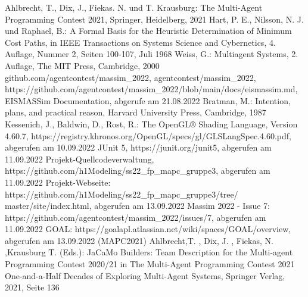 \documentclass[runningheads]{llncs}
\begin{document}
%
%
%
% 
% 
%
\begin{thebibliography}{8}
	Ahlbrecht, T., Dix, J., Fiekas. N. und T. Krausburg: The Multi-Agent Programming Contest 2021, Springer, Heidelberg, 2021
	Hart, P. E., Nilsson, N. J. und Raphael, B.: A Formal Basis for the Heuristic Determination of Minimum Cost Paths, in IEEE Transactions on Systems Science and Cybernetics, 4. Auflage, Nummer 2, Seiten 100-107, Juli 1968
	Weiss, G.: Multiagent Systems, 2. Auflage, The MIT Press, Cambridge, 2000
	github.com/agentcontest/massim\_2022, agentcontest/massim\_2022, \\ https://github.com/agentcontest/massim\_2022/blob/main/docs/eismassim.md, EISMASSim Documentation, abgerufe am 21.08.2022
	Bratman, M.: Intention, plans, and practical reason, Harvard University Press, Cambridge, 1987
	Kessenich, J., Baldwin, D., Rost, R.: The OpenGL® Shading Language, Version 4.60.7, https://registry.khronos.org/OpenGL/specs/gl/GLSLangSpec.4.60.pdf, abgerufen am 10.09.2022
	JUnit 5, https://junit.org/junit5, abgerufen am 11.09.2022
	Projekt-Quellcodeverwaltung, https://github.com/h1Modeling/ss22\_fp\_mapc\_gruppe3, abgerufen am 11.09.2022
	Projekt-Webseite: https://github.com/h1Modeling/ss22\_fp\_mapc\_gruppe3/tree/ master/site/index.html, abgerufen am 13.09.2022
	Massim 2022 - Issue 7: https://github.com/agentcontest/massim\_2022/issues/7, abgerufen am 11.09.2022
	GOAL: https://goalapl.atlassian.net/wiki/spaces/GOAL/overview, abgerufen am 13.09.2022
	\bibitem(MAPC2021)
	Ahlbrecht,T. , Dix, J. , Fiekas, N. ,Krausburg T. (Eds.): JaCaMo Builders: Team Description for the Multi-agent Programming Contest 2020/21  in The Multi-Agent Programming Contest 2021 One-and-a-Half Decades of Exploring Multi-Agent Systems, Springer Verlag, 2021, Seite 136
	
\end{thebibliography}
\end{document}
